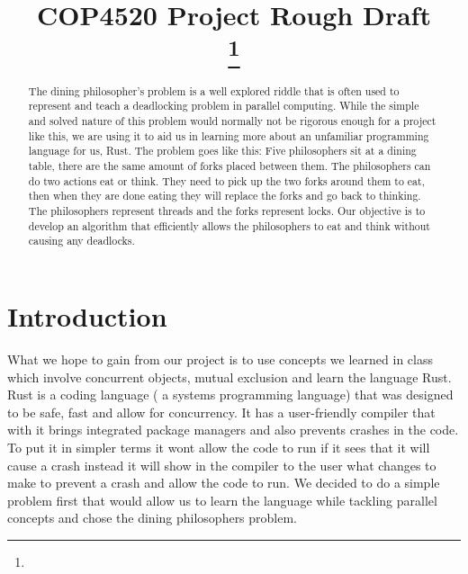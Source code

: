 \documentclass[conference]{IEEEtran}
\begin{document}
	
	\title{COP4520 Project Rough Draft\\
		{}
		\thanks{}
	}
	
	\author{
		
		\and
		\and
		\and
	}
	
	\maketitle
	
	\begin{abstract}
		The dining philosopher’s problem is a well explored riddle that is often used to represent and teach a deadlocking problem in parallel computing. While the simple and solved nature of this problem would normally not be rigorous enough for a project like this, we are using it to aid us in learning more about an unfamiliar programming language for us, Rust. The problem goes like this: Five philosophers sit at a dining table, there are the same amount of forks placed between them. The philosophers can do two actions eat or think. They need to pick up the two forks around them to eat, then when they are done eating they will replace the forks and go back to thinking. The philosophers represent threads and the forks represent locks. Our objective is to develop an algorithm that efficiently allows the philosophers to eat and think without causing any deadlocks.
	\end{abstract}
	
	
	\section{Introduction}
	What we hope to gain from our project is to use concepts we learned in class which involve concurrent objects, mutual exclusion and learn the language Rust. Rust is a coding language ( a systems programming language) that was designed to be safe, fast and allow for concurrency.  It has a user-friendly compiler that with it brings integrated package managers and also prevents crashes in the code. To put it in simpler terms it wont allow the code to run if it sees that it will cause a crash instead it will show in the compiler to the user what changes to make to prevent a crash and allow the code to run. We decided to do a simple problem first that would allow us to learn the language while tackling parallel concepts and chose the dining philosophers problem.
\end{document}
